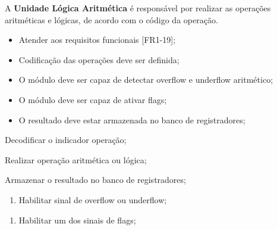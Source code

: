 A \textbf{Unidade Lógica Aritmética} é responsável por realizar as operações aritméticas e lógicas, de acordo com o código da operação.
  
\actors
	\begin{description}
	\end{description}
  
\preconditions 
	\begin{itemize}
	\item Atender aos requisitos funcionais [FR1-19];
	\item Codificação das operações deve ser definida;
	\end{itemize}

\postconditions
    \begin{itemize}
     \item O módulo deve ser capaz de detectar overflow e underflow aritmético;
     \item O módulo deve ser capaz de ativar flags;
     \item O resultado deve estar armazenada no banco de registradores; %
     \end{itemize} 
  
\begin{mainflow}
\item Decodificar o indicador operação;
\item Realizar operação aritmética ou lógica;
\item Armazenar o resultado no banco de registradores;
\end{mainflow}
  
\begin{secondaryflow} 
\begin{enumerate}
\item Habilitar sinal de overflow ou underflow;
\end{enumerate}
\begin{enumerate}
\item Habilitar um dos sinais de flags;
\end{enumerate}
\end{secondaryflow} 
